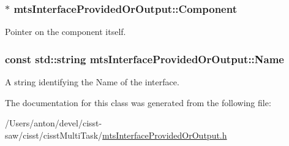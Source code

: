 \subsubsection[{Component}]{$\ast$ mts\+Interface\+Provided\+Or\+Output\+::\+Component\hspace{0.3cm}{\ttfamily [protected]}}\label{classmts_interface_provided_or_output_ac4f9f610b6910375301a7f0dfa1ec826}
Pointer on the component itself. \hypertarget{classmts_interface_provided_or_output_a8d81ba3320cfe66ab35d892cbc3b36cb}{}
\subsubsection[{Name}]{\setlength{\rightskip}{0pt plus 5cm}const std\+::string mts\+Interface\+Provided\+Or\+Output\+::\+Name\hspace{0.3cm}{\ttfamily [protected]}}\label{classmts_interface_provided_or_output_a8d81ba3320cfe66ab35d892cbc3b36cb}
A string identifying the \textquotesingle{}Name\textquotesingle{} of the interface. 

The documentation for this class was generated from the following file\+:\begin{DoxyCompactItemize}
\item 
/\+Users/anton/devel/cisst-\/saw/cisst/cisst\+Multi\+Task/\hyperlink{mts_interface_provided_or_output_8h}{mts\+Interface\+Provided\+Or\+Output.\+h}\end{DoxyCompactItemize}

